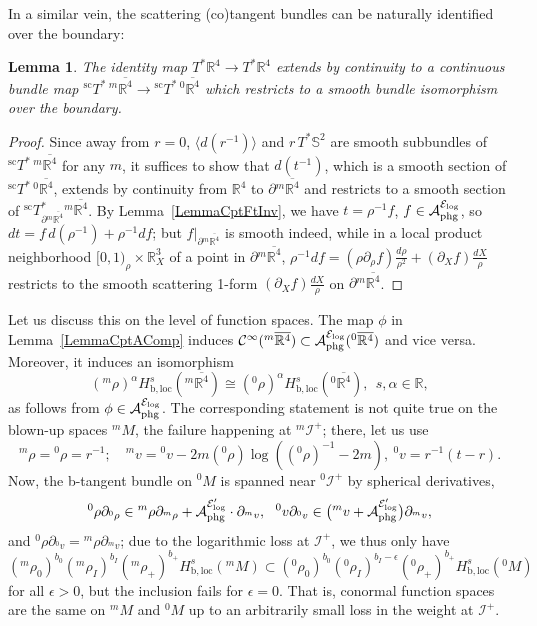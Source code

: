 \documentclass[reqno,11pt,letterpaper]{amsart}
\numberwithin{equation}{section}
\numberwithin{figure}{section}
\newtheorem{lemma}[thm]{Lemma}
\theoremstyle{definition}
\theoremstyle{remark}
\newcommand{\mc}{\mathcal}
\newcommand{\cA}{\mc A}
\newcommand{\cC}{\mc C}
\newcommand{\cE}{\mc E}
\newcommand{\ms}{\mathscr}
\newcommand{\scri}{\ms I}
\newcommand{\R}{\mathbb{R}}
\newcommand{\Sph}{\mathbb{S}}
\newcommand{\eps}{\epsilon}
\newcommand{\la}{\langle}
\newcommand{\ol}{\overline}
\newcommand{\pa}{\partial}
\newcommand{\ra}{\rangle}
\newcommand{\bop}{{\mathrm{b}}}
\newcommand{\scl}{{\mathrm{sc}}}
\newcommand{\Tsc}{{}^{\scl}T}
\newcommand{\loc}{{\mathrm{loc}}}
\newcommand{\CI}{\cC^\infty}
\newcommand{\Hbloc}{H_{\bop,\loc}}
\newcommand{\phg}{{\mathrm{phg}}}
\begin{document}
In a similar vein, the scattering (co)tangent bundles can be naturally identified over the boundary:
\begin{lemma}
\label{LemmaCptACompBundle}
  The identity map $T^*\R^4\to T^*\R^4$ extends by continuity to a continuous bundle map $\Tsc^*\,{}^m\ol{\R^4}\to\Tsc^*\,{}^0\ol{\R^4}$ which restricts to a smooth bundle isomorphism over the boundary.
\end{lemma}
\begin{proof}
  Since away from $r=0$, $\la d(r^{-1})\ra$ and $r\,T^*\Sph^2$ are smooth subbundles of $\Tsc^*\,{}^m\ol{\R^4}$ for any $m$, it suffices to show that $d(t^{-1})$, which is a smooth section of $\Tsc^*\,{}^0\ol{\R^4}$, extends by continuity from $\R^4$ to $\pa{}^m\ol{\R^4}$ and restricts to a smooth section of $\Tsc^*_{\pa{}^m\ol{\R^4}}{}^m\ol{\R^4}$. By Lemma~\ref{LemmaCptFtInv}, we have $t=\rho^{-1}f$, $f\in\cA_\phg^{\cE_{\rm log}}$, so $d t=f\,d(\rho^{-1})+\rho^{-1}d f$; but $f|_{\pa{}^m\ol{\R^4}}$ is smooth indeed, while in a local product neighborhood $[0,1)_\rho\times\R_X^3$ of a point in $\pa{}^m\ol{\R^4}$, $\rho^{-1}d f=(\rho\pa_\rho f)\frac{d\rho}{\rho^2}+(\pa_X f)\frac{d X}{\rho}$ restricts to the smooth scattering 1-form $(\pa_X f)\frac{d X}{\rho}$ on $\pa{}^m\ol{\R^4}$.
\end{proof}

Let us discuss this on the level of function spaces. The map $\phi$ in Lemma~\ref{LemmaCptAComp} induces $\CI({}^m\ol{\R^4})\subset\cA_\phg^{\cE_{\rm log}}({}^0\ol{\R^4})$ and vice versa. Moreover, it induces an isomorphism
\begin{equation}
\label{EqCptACompHb}
  ({}^m\rho)^\alpha \Hbloc^s({}^m\ol{\R^4})\cong({}^0\rho)^\alpha\Hbloc^s({}^0\ol{\R^4}),\ \ s,\alpha\in\R,
\end{equation}
as follows from $\phi\in\cA_\phg^{\cE_{\rm log}}$. The corresponding statement is not quite true on the blown-up spaces ${}^m\!M$, the failure happening at ${}^m\!\scri^+$; there, let us use
\[
  {}^m\rho={}^0\rho=r^{-1}; \quad
  {}^m v={}^0 v-2 m({}^0\rho)\log(({}^0\rho)^{-1}-2 m),\ 
  {}^0 v=r^{-1}(t-r).
\]
Now, the b-tangent bundle on ${}^0\!M$ is spanned near ${}^0\!\scri^+$ by spherical derivatives,
\[
  {}^0\rho\pa_{{}^0\rho} \in {}^m\rho\pa_{{}^m\rho} + \cA_\phg^{\cE'_{\rm log}}\cdot\pa_{{}^m v},\ \ 
  {}^0 v\pa_{{}^0 v} \in \bigl({}^m v+\cA_\phg^{\cE'_{\rm log}}\bigr)\pa_{{}^m v},
\]
and ${}^0\rho\pa_{{}^0 v}={}^m\rho\pa_{{}^m v}$; due to the logarithmic loss at $\scri^+$, we thus only have
\[
  ({}^m\rho_0)^{b_0}({}^m\rho_I)^{b_I}({}^m\rho_+)^{b_+}\Hbloc^s({}^m\!M)
  \subset ({}^0\rho_0)^{b_0}({}^0\rho_I)^{b_I-\eps}({}^0\rho_+)^{b_+}\Hbloc^s({}^0\!M)
\]
for all $\eps>0$, but the inclusion fails for $\eps=0$. That is, conormal function spaces are the same on ${}^m\!M$ and ${}^0\!M$ up to an arbitrarily small loss in the weight at $\scri^+$.
\end{document}
